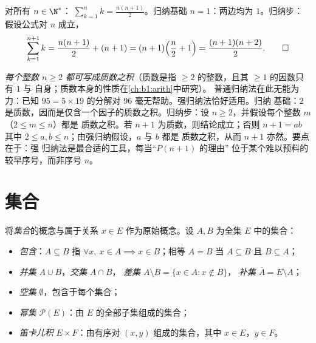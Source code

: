\begin{example}\label{ex:b1:logic:induction}
对所有 $n \in \N^*$：$\;\sum_{k=1}^n k = \frac{n(n+1)}{2}$。归纳基础
$n = 1$：两边均为 $1$。归纳步：假设公式对 $n$ 成立，
\[
\sum_{k=1}^{n+1} k = \frac{n(n+1)}{2} + (n+1)
= (n+1)\Bigl(\frac n2 + 1\Bigr) = \frac{(n+1)(n+2)}{2}. \qedhere
\]
\end{example}

\begin{example}[强归纳法的应用]\label{ex:b1:logic:strongind}
\emph{每个整数 $n \geq 2$ 都可写成质数之积}（质数是指
$\geq 2$ 的整数，且其 $\geq 1$ 的因数只有 $1$ 与
自身；质数本身的性质在\cref{ch:b1:arith}中研究）。
普通归纳法在此无能为力：已知 $95 = 5 \times 19$
的分解对 $96$ 毫无帮助。强归纳法恰好适用。归纳
基础：$2$ 是质数，因而是仅含一个因子的质数之积。归纳步：设
$n \geq 2$，并假设每个整数 $m$（$2 \leq m \leq n$）都是
质数之积。若 $n + 1$ 为质数，则结论成立；否则 $n + 1 = ab$
其中 $2 \leq a, b \leq n$；由强归纳假设，$a$ 与 $b$ 都是
质数之积，从而 $n + 1$ 亦然。要点在于：强
归纳法是最合适的工具，每当“$P(n+1)$ 的理由”
位于某个难以预料的较早序号，而非序号 $n$。
\end{example}

\section{集合}

\begin{definition}[集合的运算]\label{def:b1:logic:sets}
将\emph{集合}的概念与属于关系
$x \in E$ 作为原始概念。设 $A, B$ 为全集 $E$ 中的集合：
\begin{itemize}
  \item \emph{包含}：$A \subseteq B$ 指 $\forall x,\ x \in A
        \implies x \in B$；相等 $A = B$ 当 $A \subseteq B$ 且
        $B \subseteq A$；
  \item \emph{并集} $A \cup B$，\emph{交集} $A \cap B$，
        \emph{差集} $A \setminus B = \{x \in A : x \notin B\}$，
        \emph{补集} $\overline{A} = E \setminus A$；
  \item \emph{空集} $\emptyset$，包含于每个集合；
  \item \emph{幂集} $\mathcal{P}(E)$：由
        $E$ 的全部子集组成的集合；
  \item \emph{笛卡儿积} $E \times F$：由有序对
        $(x, y)$ 组成的集合，其中 $x \in E$，$y \in F$。
\end{itemize}
\end{definition}

